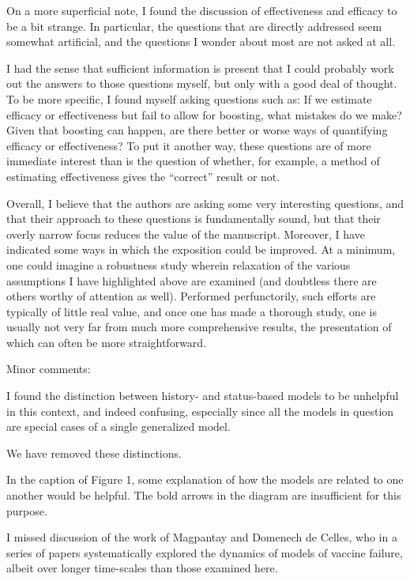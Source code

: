 \documentclass[12pt]{article}
\newcommand{\revtext}{\textsf}
\begin{document}
\revtext{On a more superficial note, I found the discussion of effectiveness and efficacy to be a bit strange. In particular, the questions that are directly addressed seem somewhat artificial, and the questions I wonder about most are not asked at all.}

\revtext{I had the sense that sufficient information is present that I could probably work out the answers to those questions myself, but only with a good deal of thought. To be more specific, I found myself asking questions such as: If we estimate efficacy or effectiveness but fail to allow for boosting, what mistakes do we make? Given that boosting can happen, are there better or worse ways of quantifying efficacy or effectiveness? To put it another way, these questions are of more immediate interest than is the question of whether, for example, a method of estimating effectiveness gives the “correct” result or not.}



\revtext{Overall, I believe that the authors are asking some very interesting questions, and that their approach to these questions is fundamentally sound, but that their overly narrow focus reduces the value of the manuscript. Moreover, I have indicated some ways in which the exposition could be improved. At a minimum, one could imagine a robustness study wherein relaxation of the various assumptions I have highlighted above are examined (and doubtless there are others worthy of attention as well). Performed perfunctorily, such efforts are typically of little real value, and once one has made a thorough study, one is usually not very far from much more comprehensive results, the presentation of which can often be more straightforward.}

\revtext{Minor comments:}

\revtext{I found the distinction between history- and status-based models to be unhelpful in this context, and indeed confusing, especially since all the models in question are special cases of a single generalized model.}

We have removed these distinctions.

\revtext{In the caption of Figure 1, some explanation of how the models are related to one another would be helpful. The bold arrows in the diagram are insufficient for this purpose.}

\revtext{I missed discussion of the work of Magpantay and Domenech de Celles, who in a series of papers systematically explored the dynamics of models of vaccine failure, albeit over longer time-scales than those examined here.}
\end{document}
